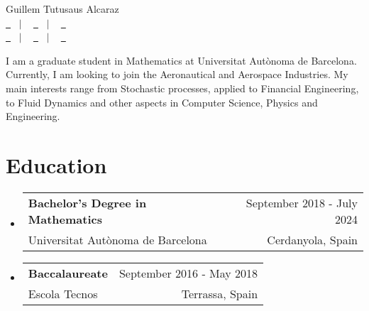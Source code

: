\documentclass[a4paper,11pt]{article}
\makeatletter
\newcommand{\resumeQuadHeading}[4]{
	\item
	\begin{tabular*}{0.96\textwidth}[t]{l@{\extracolsep{\fill}}r}
		\textbf{#1} & \small #2 \\
		\small#3 & \small #4 \\
	\end{tabular*}
}
\newcommand{\resumeHeadingListStart}{
	\begin{itemize}[leftmargin=0.15in, label={}]
	}
\newcommand{\resumeHeadingListEnd}{\end{itemize}}
\makeatother
\begin{document}
	
	\begin{center}
		{\Huge Guillem Tutusaus Alcaraz\vspace{2pt}} \\[1.25pc]
		\href{https://guillemtutusausalcaraz.weebly.com/}{\faLink \ } \ $|$ \ %
		\href{https://www.linkedin.com/in/guillemtutusausalcaraz/}{\faLinkedinSquare \ } \ $|$ \ %
		\href{https://github.com/Tutusaus}{\faGithub \ } \\[0.1pc] %
		\href{tel:+32674294157}{\faPhone \ } \ $|$ \ %
		\href{mailto:guillemtutusaus@gmail.com}{\faEnvelope \ } \ $|$ \ %
		\href{https://www.google.es/maps/place/Terrassa,+Barcelona/@41.558308,1.9759349,13z/data=!3m1!4b1!4m6!3m5!1s0x12a492e820fabbfd:0xab0d33c5f2c73098!8m2!3d41.5631482!4d2.0054917!16zL20vMGoycTc?hl=ca&entry=ttu}{\faHome \ } \\[1.5pc] %
	\end{center}
	
	\begin{justify}
		I am a graduate student in Mathematics at Universitat Autònoma de Bar\-ce\-lo\-na. Currently, I am looking to join the Aeronautical and Aerospace Industries. My main interests range from Stochastic processes, applied to Financial Engineering, to Fluid Dynamics and other aspects in Computer Science, Physics and Engineering.
	\end{justify}
	
	
	
	\section{Education}
	
	\resumeHeadingListStart{}
	\resumeQuadHeading{Bachelor's Degree in Mathematics}{September 2018 - July 2024}
	{Universitat Autònoma de Barcelona}{Cerdanyola, Spain}
	\resumeHeadingListEnd{}
	
	\resumeHeadingListStart{}
	\resumeQuadHeading{Baccalaureate}{September 2016 - May 2018}
	{Escola Tecnos}{Terrassa, Spain}
	\resumeHeadingListEnd{}
	
\end{document}
